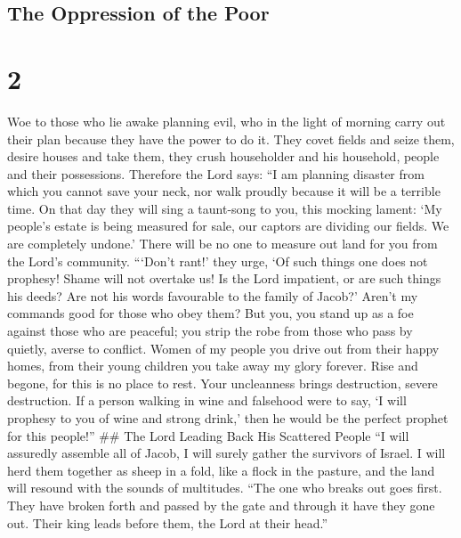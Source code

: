 \hypertarget{the-oppression-of-the-poor}{%
\subsection{The Oppression of the
Poor}\label{the-oppression-of-the-poor}}

\hypertarget{section-1}{%
\section{2}\label{section-1}}

 Woe to those who lie awake planning evil, who in the light
of morning carry out their plan because they have the power to do it.
 They covet fields and seize them, desire houses and take
them, they crush householder and his household, people and their
possessions.  Therefore the Lord says: ``I am planning
disaster from which you cannot save your neck, nor walk proudly because
it will be a terrible time.  On that day they will sing a
taunt-song to you, this mocking lament: `My people's estate is being
measured for sale, our captors are dividing our fields. We are
completely undone.'  There will be no one to measure out
land for you from the Lord's community.  ```Don't rant!'
they urge, `Of such things one does not prophesy! Shame will not
overtake us!  Is the Lord impatient, or are such things his
deeds? Are not his words favourable to the family of Jacob?' Aren't my
commands good for those who obey them?  But you, you stand
up as a foe against those who are peaceful; you strip the robe from
those who pass by quietly, averse to conflict.  Women of my
people you drive out from their happy homes, from their young children
you take away my glory forever.  Rise and begone, for this
is no place to rest. Your uncleanness brings destruction, severe
destruction.  If a person walking in wine and falsehood
were to say, `I will prophesy to you of wine and strong drink,' then he
would be the perfect prophet for this people!'' \#\# The Lord Leading
Back His Scattered People  ``I will assuredly assemble all
of Jacob, I will surely gather the survivors of Israel. I will herd them
together as sheep in a fold, like a flock in the pasture, and the land
will resound with the sounds of multitudes.  ``The one who
breaks out goes first. They have broken forth and passed by the gate and
through it have they gone out. Their king leads before them, the Lord at
their head.''

